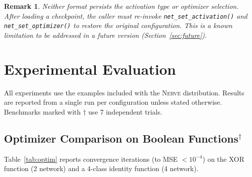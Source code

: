 \documentclass[11pt,a4paper]{article}
\newtheorem{remark}{Remark}[section]
\newcommand{\nerve}{\textsc{Nerve}}
\begin{document}
\begin{remark}
Neither format persists the activation type or optimizer selection.
After loading a checkpoint, the caller must re-invoke
\texttt{net\_set\_activation()} and \texttt{net\_set\_optimizer()} to restore
the original configuration. This is a known limitation to be addressed in a
future version (Section~\ref{sec:future}).
\end{remark}

\section{Experimental Evaluation}
\label{sec:eval}

All experiments use the examples included with the \nerve{} distribution.
Results are reported from a single run per configuration unless stated
otherwise. Benchmarks marked with $\dagger$ use 7 independent trials.

\subsection{Optimizer Comparison on Boolean Functions$^\dagger$}
\label{sec:bench-optim}

Table~\ref{tab:optim} reports convergence iterations (to MSE $< 10^{-4}$)
on the XOR function (2 network) and a 4-class
identity function (4 network).
\end{document}
